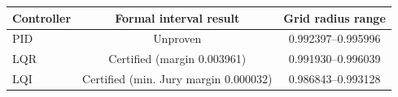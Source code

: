 \begin{tabular}{lcc}\toprule
Controller & Formal interval result & Grid radius range \\
\midrule
PID & Unproven & 0.992397--0.995996 \\
LQR & Certified (margin 0.003961) & 0.991930--0.996039 \\
LQI & Certified (min. Jury margin 0.000032) & 0.986843--0.993128 \\
\bottomrule\end{tabular}
